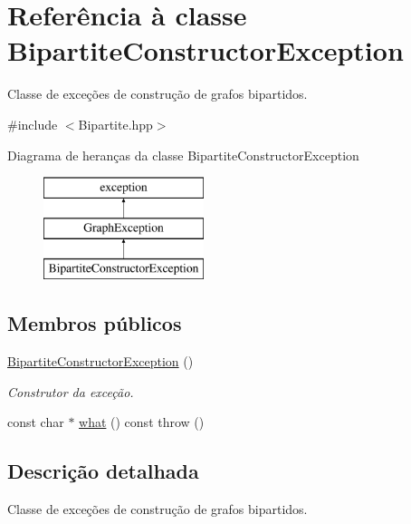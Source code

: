 \hypertarget{classBipartiteConstructorException}{}\section{Referência à classe Bipartite\+Constructor\+Exception}
\label{classBipartiteConstructorException}


Classe de exceções de construção de grafos bipartidos.  




{\ttfamily \#include $<$Bipartite.\+hpp$>$}

Diagrama de heranças da classe Bipartite\+Constructor\+Exception\begin{figure}[H]
\begin{center}
\leavevmode
\includegraphics[height=3.000000cm]{classBipartiteConstructorException}
\end{center}
\end{figure}
\subsection*{Membros públicos}
\begin{DoxyCompactItemize}
\item 
\mbox{\label{classBipartiteConstructorException_a303013e25057612d9cac2e7450943d6d}} 
\mbox{\hyperlink{classBipartiteConstructorException_a303013e25057612d9cac2e7450943d6d}{Bipartite\+Constructor\+Exception}} ()
\begin{DoxyCompactList}\small\item\em Construtor da exceção. \end{DoxyCompactList}\item 
const char $\ast$ \mbox{\hyperlink{classBipartiteConstructorException_a11f033387020957b5ccd952914475807}{what}} () const  throw ()
\end{DoxyCompactItemize}


\subsection{Descrição detalhada}
Classe de exceções de construção de grafos bipartidos. 

